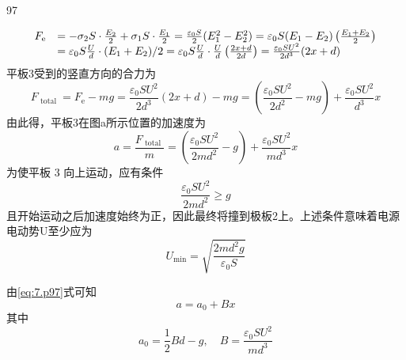 \begin{solution}{97}
\begin{subsolution}
\begin{equation}
            \begin{array}{r l} F _ {\mathrm{e}} & = - \sigma_ {2} S \cdot \frac {E _ {2}}{2} + \sigma_ {1} S \cdot \frac {E _ {1}}{2} = \frac {\varepsilon_ {0} S}{2} (E _ {1} ^ {2} - E _ {2} ^ {2}) = \varepsilon_ {0} S (E _ {1} - E _ {2}) \left(\frac {E _ {1} + E _ {2}}{2}\right) \\ & = \varepsilon_ {0} S \frac {U}{d} \cdot (E _ {1} + E _ {2}) / 2 = \varepsilon_ {0} S \frac {U}{d} \cdot \frac {U}{d} \left(\frac {2 x + d}{2 d}\right) = \frac {\varepsilon_ {0} S U ^ {2}}{2 d ^ {3}} (2 x + d) \end{array}
            \label{eq:6.p97}
        \end{equation}
        平板3受到的竖直方向的合力为
        \begin{equation*}
            F _ {\text { total }} = F _ {\mathrm{e}} - m g = \frac {\varepsilon_ {0} S U ^ {2}}{2 d ^ {3}} (2 x + d) - m g = \left(\frac {\varepsilon_ {0} S U ^ {2}}{2 d ^ {2}} - m g\right) + \frac {\varepsilon_ {0} S U ^ {2}}{d ^ {3}} x
        \end{equation*}
        由此得，平板3在图a所示位置的加速度为
        \begin{equation}
            a = \frac {F _ {\text { total }}}{m} = \left(\frac {\varepsilon_ {0} S U ^ {2}}{2 m d ^ {2}} - g\right) + \frac {\varepsilon_ {0} S U ^ {2}}{m d ^ {3}} x
            \label{eq:7.p97}
        \end{equation}
        为使平板 3 向上运动，应有条件
        \begin{equation*}
            \frac {\varepsilon_ {0} S U ^ {2}}{2 m d ^ {2}} \geq g
        \end{equation*}
        且开始运动之后加速度始终为正，因此最终将撞到极板2上。上述条件意味着电源电动势U至少应为
        \begin{equation}
            U _ {\min} = \sqrt {\frac {2 m d ^ {2} g}{\varepsilon_ {0} S}}
            \label{eq:8.p97}
        \end{equation}
    \end{subsolution}
    \begin{subsolution}
        由\eqref{eq:7.p97}式可知
        \begin{equation*}
            a = a _ {0} + B x
        \end{equation*}
        其中
        \begin{equation*}
            a _ {0} = \frac {1}{2} B d - g, \quad B = \frac {\varepsilon_ {0} S U ^ {2}}{m d ^ {3}}
        \end{equation*}

\end{subsolution}
\end{solution}

